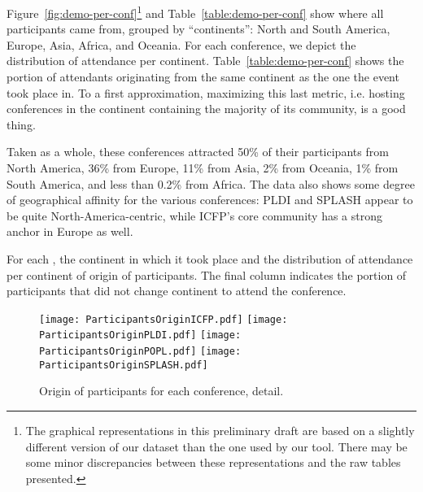Figure~\ref{fig:demo-per-conf}\footnote{The graphical representations in
  this preliminary draft are based on a slightly different version of our
  dataset than the one used by our tool. There may be some minor
  discrepancies between these representations and the raw tables
  presented.} and Table~\ref{table:demo-per-conf} show
where all participants came from, grouped by ``continents'': North and South
America, Europe, Asia, Africa, and Oceania. For each conference, we depict the
distribution of attendance per continent. Table~\ref{table:demo-per-conf}
shows the portion of attendants originating from the same continent as the
one the event took place in. To a first approximation, maximizing this last
metric, i.e. hosting conferences in the continent containing the majority of
its community, is a good thing.

Taken as a whole, these conferences attracted 50\% of their participants
from North
America, 36\% from Europe, 11\% from Asia, 2\% from Oceania, 1\% from South
America, and less than 0.2\% from Africa.
The data also shows some degree of geographical affinity for the
various conferences:
PLDI and SPLASH appear to be quite North-America-centric, while
ICFP's core community has a strong anchor in Europe as well.

\begin{table}
  \centering
  \caption{For each \event, the continent in which it took place and
    the distribution of attendance per continent of origin of participants.
    The final column indicates the
    portion of participants that did not change continent to attend the conference.}
  \label{table:demo-per-event}
\end{table}

\begin{figure}
  \centering
  \texttt{[image: ParticipantsOriginICFP.pdf]}
  \texttt{[image: ParticipantsOriginPLDI.pdf]}
  \texttt{[image: ParticipantsOriginPOPL.pdf]}
  \texttt{[image: ParticipantsOriginSPLASH.pdf]}
  \caption{Origin of participants for each conference, detail.}
  \label{fig:demo-per-event}
\end{figure}

